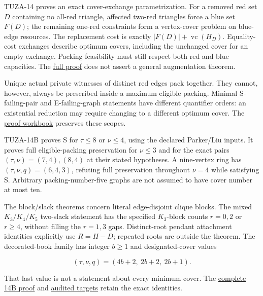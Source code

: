 \documentclass[11pt,a4paper]{article}
\begin{document}
TUZA-14 proves an exact cover-exchange parametrization. For a removed red set \(D\) containing no all-red triangle, affected two-red triangles force a blue set \(F(D)\); the remaining one-red constraints form a vertex-cover problem on blue-edge resources. The replacement cost is exactly \(|F(D)|+\operatorname{vc}(H_D)\). Equality-cost exchanges describe optimum covers, including the unchanged cover for an empty exchange. Packing feasibility must still respect both red and blue capacities. The \href{https://github.com/pappa211/ai-math-experiments/blob/main/problems/TUZA-14/notes/EXCHANGE_CHARACTERIZATION.md}{full proof} does not assert a general augmentation theorem.

Unique actual private witnesses of distinct red edges pack together. They cannot, however, always be prescribed inside a maximum eligible packing. Minimal S-failing-pair and E-failing-graph statements have different quantifier orders: an existential reduction may require changing to a different optimum cover. The \href{https://github.com/pappa211/ai-math-experiments/blob/main/problems/TUZA-14/PROOF_WORKBOOK.md}{proof workbook} preserves these scopes.

TUZA-14B proves S for \(\tau\le8\) or \(\nu\le4\), using the declared Parker/Liu inputs. It proves full eligible-packing preservation for \(\nu\le3\) and for the exact pairs \((\tau,\nu)=(7,4),(8,4)\) at their stated hypotheses. A nine-vertex ring has \((\tau,\nu,q)=(6,4,3)\), refuting full preservation throughout \(\nu=4\) while satisfying S. Arbitrary packing-number-five graphs are not assumed to have cover number at most ten.

The block/slack theorems concern literal edge-disjoint clique blocks. The mixed \(K_3/K_4/K_5\) two-slack statement has the specified \(K_3\)-block counts \(r=0,2\) or \(r\ge4\), without filling the \(r=1,3\) gaps. Distinct-root pendant attachment identities explicitly use \(R=H-D\); repeated roots are outside the theorem. The decorated-book family has integer \(b\ge1\) and designated-cover values

\[(\tau,\nu,q)=(4b+2,\ 2b+2,\ 2b+1).\]

That last value is not a statement about every minimum cover. The \href{https://github.com/pappa211/ai-math-experiments/blob/main/problems/TUZA-14B/PROOF_AND_OBSTRUCTIONS.md}{complete 14B proof} and \href{https://github.com/pappa211/ai-math-experiments/blob/main/problems/TUZA-14B/verification/FROZEN_TARGETS.md}{audited targets} retain the exact identities.
\end{document}
